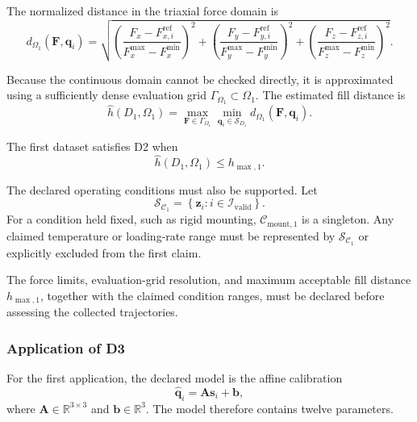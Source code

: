 \documentclass[11pt,a4paper]{article}
\begin{document}
The normalized distance in the triaxial force domain is
\begin{equation}
    d_{\Omega_1}(\mathbf{F},\mathbf{q}_i)
    =
    \sqrt{
        \left(
            \frac{F_x-F_{x,i}^{\mathrm{ref}}}
                 {F_x^{\max}-F_x^{\min}}
        \right)^2
        +
        \left(
            \frac{F_y-F_{y,i}^{\mathrm{ref}}}
                 {F_y^{\max}-F_y^{\min}}
        \right)^2
        +
        \left(
            \frac{F_z-F_{z,i}^{\mathrm{ref}}}
                 {F_z^{\max}-F_z^{\min}}
        \right)^2
    }.
\end{equation}

Because the continuous domain cannot be checked directly, it is approximated
using a sufficiently dense evaluation grid
$\Gamma_{\Omega_1}\subset\Omega_1$. The estimated fill distance is
\begin{equation}
    \widehat{h}(D_1,\Omega_1)
    =
    \max_{\mathbf{F}\in\Gamma_{\Omega_1}}
    \min_{\mathbf{q}_i\in\mathcal{S}_{D_1}}
    d_{\Omega_1}(\mathbf{F},\mathbf{q}_i).
\end{equation}

The first dataset satisfies D2 when
\begin{equation}
    \widehat{h}(D_1,\Omega_1)
    \leq
    h_{\max,1}.
\end{equation}

The declared operating conditions must also be supported. Let
\begin{equation}
    \mathcal{S}_{\mathcal{C}_1}
    =
    \left\{
        \mathbf{z}_i
        :
        i\in\mathcal{I}_{\mathrm{valid}}
    \right\}.
\end{equation}
For a condition held fixed, such as rigid mounting,
$\mathcal{C}_{\mathrm{mount},1}$ is a singleton. Any claimed temperature or
loading-rate range must be represented by
$\mathcal{S}_{\mathcal{C}_1}$ or explicitly excluded from the first claim.

The force limits, evaluation-grid resolution, and maximum acceptable fill
distance $h_{\max,1}$, together with the claimed condition ranges, must be
declared before assessing the collected trajectories.
\subsubsection{Application of D3}

For the first application, the declared model is the affine calibration
\begin{equation}
    \widehat{\mathbf{q}}_i
    =
    \mathbf{A}\mathbf{s}_i+\mathbf{b},
\end{equation}
where $\mathbf{A}\in\mathbb{R}^{3\times3}$ and
$\mathbf{b}\in\mathbb{R}^{3}$. The model therefore contains twelve parameters.
\end{document}
